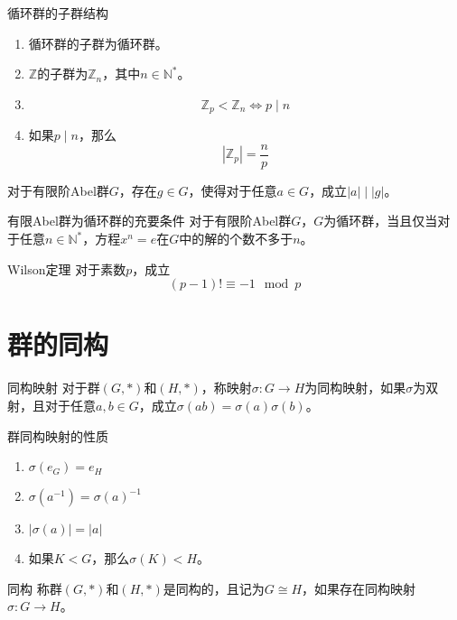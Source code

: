 \documentclass[lang = cn, scheme = chinese, thmcnt = section]{elegantbook}
\newcommand{\N}{\mathbb{N}}            %
\newcommand{\Z}{\mathbb{Z}}            %
\begin{document}
\begin{proposition}{循环群的子群结构}
	\begin{enumerate}
		\item 循环群的子群为循环群。
		\item $\Z$的子群为$\Z_n$，其中$n\in\N^*$。
		\item 
		$$
		\Z_p<\Z_n\iff p\mid n
		$$
		\item 如果$p\mid n$，那么
		$$
		|\Z_p|=\frac{n}{p}
		$$
	\end{enumerate}
\end{proposition}

\begin{lemma}
	对于有限阶Abel群$G$，存在$g\in G$，使得对于任意$a\in G$，成立$|a|\mid |g|$。
\end{lemma}

\begin{theorem}{有限Abel群为循环群的充要条件}
	对于有限阶Abel群$G$，$G$为循环群，当且仅当对于任意$n\in\mathbb{N}^*$，方程$x^n=e$在$G$中的解的个数不多于$n$。
\end{theorem}

\begin{theorem}{Wilson定理}
	对于素数$p$，成立
	$$
	(p-1)!\equiv -1\mod p
	$$
\end{theorem}

\section{群的同构}

\begin{definition}{同构映射}
	对于群$(G,*)$和$(H,*)$，称映射$\sigma:G\to H$为同构映射，如果$\sigma$为双射，且对于任意$a,b\in G$，成立$\sigma(ab)=\sigma(a)\sigma(b)$。
\end{definition}

\begin{proposition}{群同构映射的性质}
	\begin{enumerate}
		\item $\sigma(e_G)=e_H$
		\item $\sigma(a^{-1})=\sigma(a)^{-1}$
		\item $|\sigma(a)|=|a|$
		\item 如果$K< G$，那么$\sigma(K)<H$。
	\end{enumerate}
\end{proposition}

\begin{definition}{同构}
	称群$(G,*)$和$(H,*)$是同构的，且记为$G\cong H$，如果存在同构映射$\sigma:G\to H$。
\end{definition}
\end{document}
